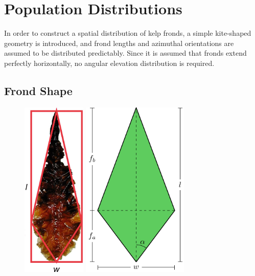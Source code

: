 \documentclass[ms,cpyr,lof,lot]{uathesis}
\begin{document}
\section{Population Distributions}
In order to construct a spatial distribution of kelp fronds, a simple kite-shaped geometry is introduced,
and frond lengths and azimuthal orientations are assumed to be distributed predictably.
Since it is assumed that fronds extend perfectly horizontally, no angular elevation distribution is required.

\subsection{Frond Shape}
\label{sec:shape}

\begin{figure}[h]
	\centering
  \includegraphics[width=1.2in]{kelp_photo/kite}
  \qquad
	\includegraphics[width=2in]{frond}
	\label{fig:frond}
\end{figure}
\end{document}
